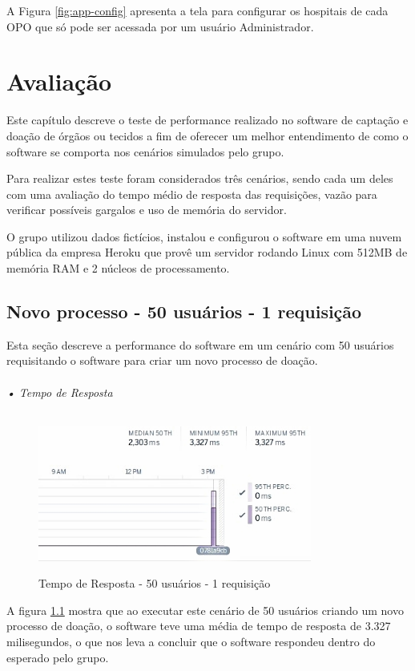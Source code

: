 \documentclass[portuguese,oneside]{tcc}
\begin{document}
A Figura \ref{fig:app-config} apresenta a tela para configurar os hospitais de cada OPO que só pode ser acessada por um usuário Administrador. 

\chapter{Avaliação}
Este capítulo descreve o teste de performance realizado no software de captação e doação de órgãos ou tecidos a fim de oferecer um melhor entendimento de como o software se comporta nos cenários simulados pelo grupo.

Para realizar estes teste foram considerados três cenários, sendo cada um deles com uma avaliação do tempo médio de resposta das requisições, vazão para verificar possíveis gargalos e uso de memória do servidor.

O grupo utilizou dados fictícios, instalou e configurou o software em uma nuvem pública da empresa Heroku que provê um servidor rodando Linux com 512MB de memória RAM e 2 núcleos de processamento.  

\section{Novo processo - 50 usuários - 1 requisição}
Esta seção descreve a performance do software em um cenário com 50 usuários requisitando o software para criar um novo processo de doação.

\subparagraph{• Tempo de Resposta}
\begin{figure}[htp]
\centering
\caption{Tempo de Resposta - 50 usuários - 1 requisição}
\includegraphics[width=9cm]{50-1-response-time}
\label{fig:tempo-reposta-50-1}
\end{figure}

A figura \ref{fig:tempo-reposta-50-1} mostra que ao executar este cenário de 50 usuários criando um novo processo de doação, o software teve uma média de tempo de resposta de 3.327 milisegundos, o que nos leva a concluir que o software respondeu dentro do esperado pelo grupo.
\end{document}
